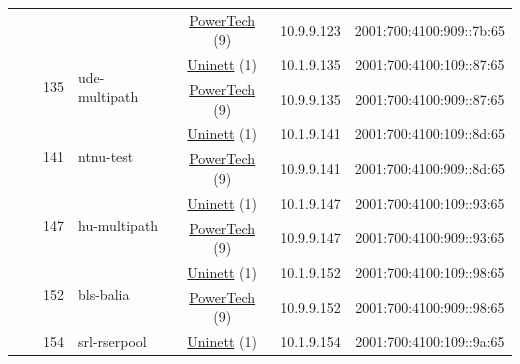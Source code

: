 \begin{small}
\begin{center}
\begin{longtable}{|c|c|c|c|c|c|c|c|}
  &  &  &  & \multicolumn{2}{|c|}{\tiny{\href{http://www.powertech.no}{PowerTech} (9)}} & \tiny{10.9.9.123} & \tiny{2001:700:4100:909::7b:65} \\* \cline{3-3}\cline{4-4}\cline{5-5}\cline{6-6}\cline{7-7}\cline{8-8}
  &  & \multirow{2}{*}{\tiny{135}} & \multicolumn{1}{|l|}{\multirow{2}{*}{\tiny{ude-multipath}}} & \multicolumn{2}{|c|}{\tiny{\href{https://www.uninett.no}{Uninett} (1)}} & \tiny{10.1.9.135} & \tiny{2001:700:4100:109::87:65} \\* \cline{5-5}\cline{6-6}\cline{7-7}\cline{8-8}
  &  &  &  & \multicolumn{2}{|c|}{\tiny{\href{http://www.powertech.no}{PowerTech} (9)}} & \tiny{10.9.9.135} & \tiny{2001:700:4100:909::87:65} \\* \cline{3-3}\cline{4-4}\cline{5-5}\cline{6-6}\cline{7-7}\cline{8-8}
  &  & \multirow{2}{*}{\tiny{141}} & \multicolumn{1}{|l|}{\multirow{2}{*}{\tiny{ntnu-test}}} & \multicolumn{2}{|c|}{\tiny{\href{https://www.uninett.no}{Uninett} (1)}} & \tiny{10.1.9.141} & \tiny{2001:700:4100:109::8d:65} \\* \cline{5-5}\cline{6-6}\cline{7-7}\cline{8-8}
  &  &  &  & \multicolumn{2}{|c|}{\tiny{\href{http://www.powertech.no}{PowerTech} (9)}} & \tiny{10.9.9.141} & \tiny{2001:700:4100:909::8d:65} \\* \cline{3-3}\cline{4-4}\cline{5-5}\cline{6-6}\cline{7-7}\cline{8-8}
  &  & \multirow{2}{*}{\tiny{147}} & \multicolumn{1}{|l|}{\multirow{2}{*}{\tiny{hu-multipath}}} & \multicolumn{2}{|c|}{\tiny{\href{https://www.uninett.no}{Uninett} (1)}} & \tiny{10.1.9.147} & \tiny{2001:700:4100:109::93:65} \\* \cline{5-5}\cline{6-6}\cline{7-7}\cline{8-8}
  &  &  &  & \multicolumn{2}{|c|}{\tiny{\href{http://www.powertech.no}{PowerTech} (9)}} & \tiny{10.9.9.147} & \tiny{2001:700:4100:909::93:65} \\* \cline{3-3}\cline{4-4}\cline{5-5}\cline{6-6}\cline{7-7}\cline{8-8}
  &  & \multirow{2}{*}{\tiny{152}} & \multicolumn{1}{|l|}{\multirow{2}{*}{\tiny{bls-balia}}} & \multicolumn{2}{|c|}{\tiny{\href{https://www.uninett.no}{Uninett} (1)}} & \tiny{10.1.9.152} & \tiny{2001:700:4100:109::98:65} \\* \cline{5-5}\cline{6-6}\cline{7-7}\cline{8-8}
  &  &  &  & \multicolumn{2}{|c|}{\tiny{\href{http://www.powertech.no}{PowerTech} (9)}} & \tiny{10.9.9.152} & \tiny{2001:700:4100:909::98:65} \\* \cline{3-3}\cline{4-4}\cline{5-5}\cline{6-6}\cline{7-7}\cline{8-8}
  &  & \multirow{2}{*}{\tiny{154}} & \multicolumn{1}{|l|}{\multirow{2}{*}{\tiny{srl-rserpool}}} & \multicolumn{2}{|c|}{\tiny{\href{https://www.uninett.no}{Uninett} (1)}} & \tiny{10.1.9.154} & \tiny{2001:700:4100:109::9a:65} \\* \cline{5-5}\cline{6-6}\cline{7-7}\cline{8-8}

\end{longtable}
\end{center}
\end{small}
